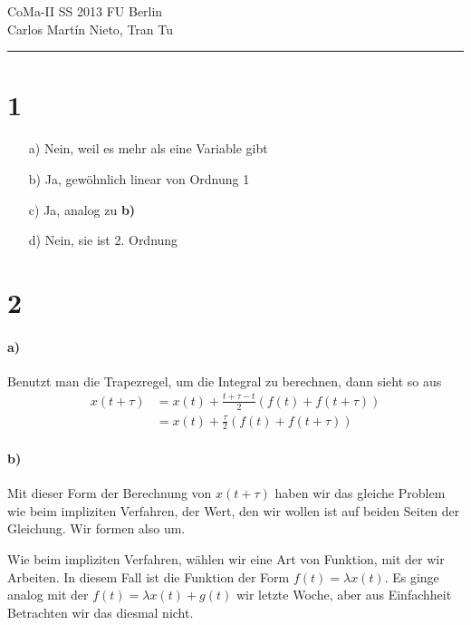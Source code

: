 \documentclass[ngerman,a4paper]{scrartcl}
\begin{document}
{\sffamily
  \hfill
  CoMa-II SS 2013\hfill
  FU Berlin\\[8pt]
  \hfill Carlos Martín Nieto, Tran Tu\hrule \bigskip
}

\section*{1}

\begin{itemize}
\item[a)] Nein, weil es mehr als eine Variable gibt
\item[b)] Ja, gewöhnlich linear von Ordnung 1
\item[c)] Ja, analog zu \textbf{b)}
\item[d)] Nein, sie ist 2. Ordnung
\end{itemize}
\section*{2}

\paragraph{a)}

Benutzt man die Trapezregel, um die Integral zu berechnen, dann sieht so aus
\begin{align*}
  x(t + \tau) &= x(t) + \frac{t+\tau-t}{2} (f(t) + f(t+\tau))\\
  &= x(t) + \frac{\tau}{2} (f(t) + f(t+\tau))
\end{align*}

\paragraph{b)}

Mit dieser Form der Berechnung von $x(t+\tau)$ haben wir das gleiche
Problem wie beim impliziten Verfahren, der Wert, den wir wollen ist
auf beiden Seiten der Gleichung. Wir formen also um.

Wie beim impliziten Verfahren, wählen wir eine Art von Funktion, mit
der wir Arbeiten. In diesem Fall ist die Funktion der Form $f(t) =
\lambda x(t)$. Es ginge analog mit der $f(t) = \lambda x(t) + g(t)$
wir letzte Woche, aber aus Einfachheit Betrachten wir das diesmal
nicht.
\end{document}
